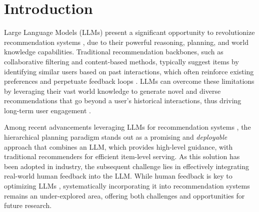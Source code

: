 \documentclass[11pt]{article}
\newcommand{\jw}[1]{{\small\color{blue}{\bf JW: #1}}}
\begin{document}
\section{Introduction}

Large Language Models (LLMs) present a significant opportunity to revolutionize recommendation systems \cite{wu2024survey}, due to their powerful reasoning, planning, and world knowledge capabilities. Traditional recommendation backbones, such as collaborative filtering and content-based methods, typically suggest items by identifying similar users based on past interactions, which often reinforce existing preferences and perpetuate feedback loops \cite{chaney2018algorithmic, mansoury2020feedback}. LLMs can overcome these limitations by leveraging their vast world knowledge to generate novel and diverse recommendations that go beyond a user's historical interactions, thus driving long-term user engagement \cite{chen2021exploration}.

Among recent advancements leveraging LLMs for recommendation systems \cite{bao2023tallrec,lin2023rella,wang2024large},
the hierarchical planning paradigm \cite{wang2024llms} stands out as a promising and \textit{deployable} approach that combines an LLM, which provides high-level guidance, with traditional recommenders for efficient item-level serving. As this solution has been adopted in industry, the subsequent challenge lies in effectively integrating real-world human feedback into the LLM. While human feedback is key to optimizing LLMs \cite{ouyang2022training}, systematically incorporating it into recommendation systems remains an under-explored area, offering both challenges and opportunities for future research.



\end{document}
